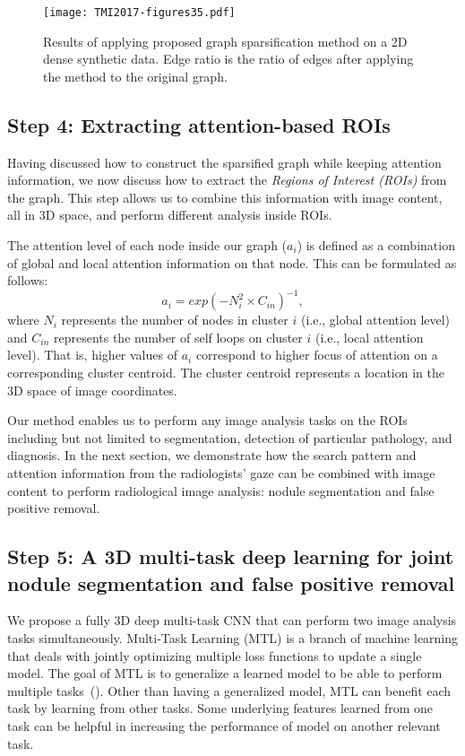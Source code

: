 \documentclass[preprint,12pt]{elsarticle}
\begin{document}
\begin{figure}[h]
\centering
\texttt{[image: TMI2017-figures35.pdf]}
\caption{Results of applying proposed graph sparsification method on a 2D dense synthetic data. Edge ratio is the ratio of edges after applying the method to the original graph. \label{fig:2Dtoy}}
\end{figure}




\subsection{Step 4: Extracting attention-based ROIs}
Having discussed how to construct the sparsified graph while keeping attention information, we now discuss how to extract the \textit{Regions of Interest (ROIs)} from the graph. This step allows us to combine this information with image content, all in 3D space, and perform different analysis inside ROIs.


The attention level of each node inside our graph ($a_{i}$) is defined as a combination of global and local attention information on that node. This can be formulated as follows:
\begin{equation}
a_{i}=exp({-N_{i}^{2}\times C_{in}})^{-1},
\end{equation}
\noindent where $N_{i}$ represents the number of nodes in cluster $i$ (i.e., global attention level) and $C_{in}$ represents the number of self loops on cluster $i$ (i.e., local attention level). That is, higher values of $a_{i}$ correspond to higher focus of attention on a corresponding cluster centroid. The cluster centroid represents a location in the 3D space of image coordinates.


Our method enables us to perform any image analysis tasks on the ROIs including but not limited to segmentation, detection of particular pathology, and diagnosis. In the next section, we demonstrate how the search pattern and attention information from the radiologists' gaze can be combined with image content to perform radiological image analysis: nodule segmentation and false positive removal.


\subsection{Step 5: A 3D multi-task deep learning for joint nodule segmentation and false positive removal}
We propose a fully 3D deep multi-task CNN that can perform two image analysis tasks simultaneously. Multi-Task Learning (MTL) is a branch of machine learning that deals with jointly optimizing multiple loss functions to update a single model. The goal of MTL is to generalize a learned model to be able to perform multiple tasks~(\cite{caruana1998multitask}). Other than having a generalized model, MTL can benefit each task by learning from other tasks. Some underlying features learned from one task can be helpful in increasing the performance of model on another relevant task.
\end{document}
